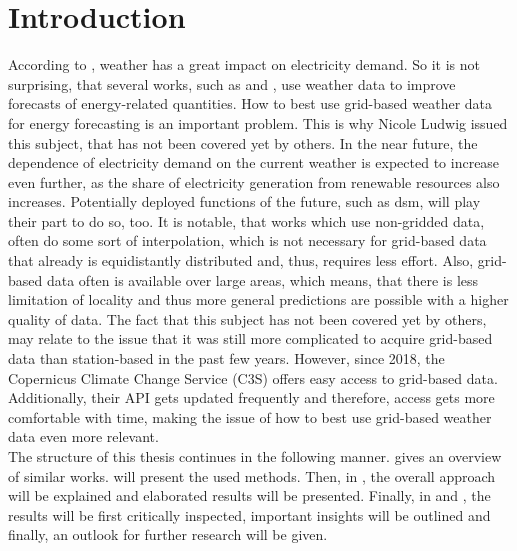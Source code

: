 \chapter{Introduction}
\label{ch:Introduction}

According to , weather has a great impact on electricity demand. So it is not surprising, that several works, such as  and , use weather data to improve forecasts of energy-related quantities. How to best use grid-based weather data for energy forecasting is an important problem. This is why Nicole Ludwig issued this subject, that has not been covered yet by others. In the near future, the dependence of electricity demand on the current weather is expected to increase even further, as the share of electricity generation from renewable resources also increases. Potentially deployed functions of the future, such as \gls{dsm}, will play their part to do so, too. It is notable, that works which use non-gridded data, often do some sort of interpolation, which is not necessary for grid-based data that already is equidistantly distributed and, thus, requires less effort. Also, grid-based data often is available over large areas, which means, that there is less limitation of locality and thus more general predictions are possible with a higher quality of data. The fact that this subject has not been covered yet by others, may relate to the issue that it was still more complicated to acquire grid-based data than station-based in the past few years. However, since 2018, the Copernicus Climate Change Service (C3S) offers easy access to grid-based data. Additionally, their API gets updated frequently and therefore, access gets more comfortable with time, making the issue of how to best use grid-based weather data even more relevant.\\

The structure of this thesis continues in the following manner.  gives an overview of similar works.  will present the used methods. Then, in , the overall approach will be explained and elaborated results will be presented. Finally, in  and , the results will be first critically inspected, important insights will be outlined and finally, an outlook for further research will be given.\\

